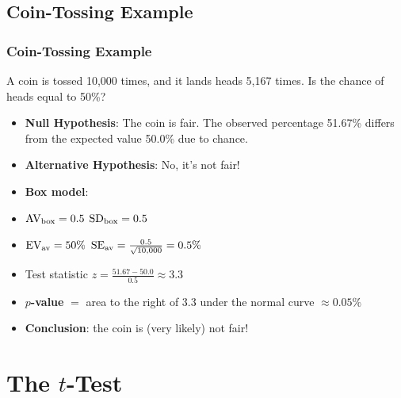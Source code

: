 \documentclass[t]{beamer}
\begin{document}
\subsection{Coin-Tossing Example}
\begin{frame}
\frametitle{Coin-Tossing Example}

{\small 
A coin is tossed 10,000 times, and it lands heads 5,167 times.  Is the chance of heads equal to 50\%?

\begin{itemize}
\item \textbf{\color{blue}Null Hypothesis}:  The coin is fair.  The observed percentage 51.67\% differs
from the expected value 50.0\% due to chance.
\item \textbf{\color{blue}Alternative Hypothesis}: No, it's not fair!
\item \textbf{\color{blue}Box model}: 
\item $\mbox{AV}_{\mbox{\scriptsize box}} = 0.5$ \hspace{.5in} 
   $\mbox{SD}_{\mbox{\scriptsize box}} = 0.5$ 
\item $\mbox{EV}_{\mbox{\scriptsize av}} = 50\%$ \hspace{.5in}
   $\mbox{SE}_{\mbox{\scriptsize av}} = \frac{0.5}{\sqrt{10,000}}= 0.5\%$ 
\item Test statistic $\displaystyle z=\frac{51.67 - 50.0}{0.5} \approx 3.3$
\item \textbf{\color{blue}$p$-value} $=$ area to the right of 3.3 under the normal curve $\approx 0.05\%$
\item \textbf{\color{blue}Conclusion}:  the coin is (very likely) not fair!
\end{itemize}
}

\end{frame}


\section{The $t$-Test}
\end{document}
